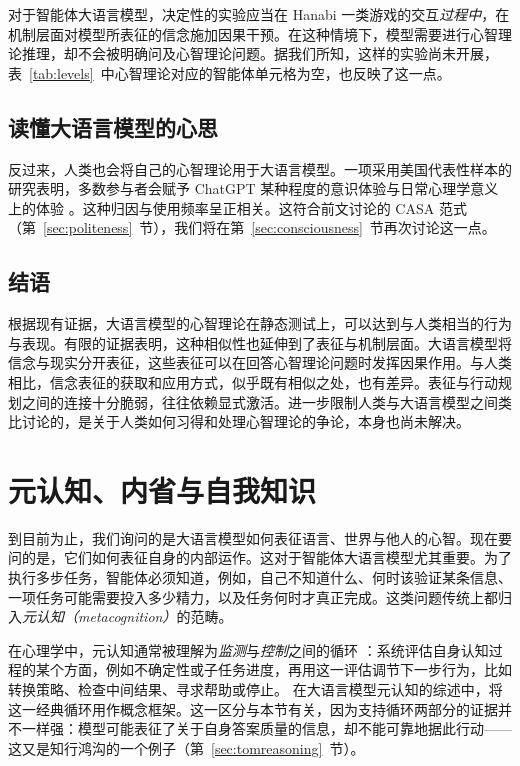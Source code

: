 对于智能体大语言模型，决定性的实验应当在 Hanabi 一类游戏的交互\emph{过程中}，在机制层面对模型所表征的信念施加因果干预。在这种情境下，模型需要进行心智理论推理，却不会被明确问及心智理论问题。据我们所知，这样的实验尚未开展，表~\ref{tab:levels}~中心智理论对应的智能体单元格为空，也反映了这一点。

\subsection{读懂大语言模型的心思}
反过来，人类也会将自己的心智理论用于大语言模型。一项采用美国代表性样本的研究表明，多数参与者会赋予 ChatGPT 某种程度的意识体验与日常心理学意义上的体验 \citep{colombatto2024folk}。这种归因与使用频率呈正相关。这符合前文讨论的 CASA 范式（第~\ref{sec:politeness}~节），我们将在第~\ref{sec:consciousness}~节再次讨论这一点。

\subsection{结语}
根据现有证据，大语言模型的心智理论在静态测试上，可以达到与人类相当的行为与表现。有限的证据表明，这种相似性也延伸到了表征与机制层面。大语言模型将信念与现实分开表征，这些表征可以在回答心智理论问题时发挥因果作用。与人类相比，信念表征的获取和应用方式，似乎既有相似之处，也有差异。表征与行动规划之间的连接十分脆弱，往往依赖显式激活。进一步限制人类与大语言模型之间类比讨论的，是关于人类如何习得和处理心智理论的争论，本身也尚未解决。

\section{元认知、内省与自我知识} \label{sec:metacognition}
到目前为止，我们询问的是大语言模型如何表征语言、世界与他人的心智。现在要问的是，它们如何表征自身的内部运作。这对于智能体大语言模型尤其重要。为了执行多步任务，智能体必须知道，例如，自己不知道什么、何时该验证某条信息、一项任务可能需要投入多少精力，以及任务何时才真正完成。这类问题传统上都归入\emph{元认知（metacognition）}的范畴。

在心理学中，元认知通常被理解为\emph{监测}与\emph{控制}之间的循环 \citep{nelson1990meta}：系统评估自身认知过程的某个方面，例如不确定性或子任务进度，再用这一评估调节下一步行为，比如转换策略、检查中间结果、寻求帮助或停止。\citet{liu2026metacog} 在大语言模型元认知的综述中，将这一经典循环用作概念框架。这一区分与本节有关，因为支持循环两部分的证据并不一样强：模型可能表征了关于自身答案质量的信息，却不能可靠地据此行动——这又是知行鸿沟的一个例子（第~\ref{sec:tomreasoning}~节）。

